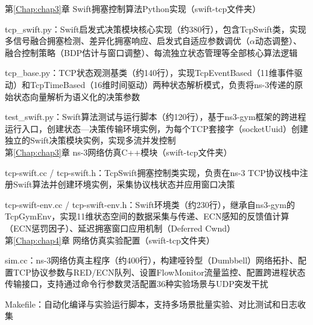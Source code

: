 \begin{ProgramList}

第\ref{Chap:chap3}章 Swift拥塞控制算法Python实现（swift-tcp文件夹）

tcp\_swift.py：Swift启发式决策模块核心实现（约380行），包含TcpSwift类，实现多信号融合拥塞检测、差异化拥塞响应、启发式自适应参数调优（$\alpha$动态调整）、融合控制策略（BDP估计与窗口调整）、每流独立状态管理等全部核心算法逻辑

tcp\_base.py：TCP状态观测基类（约140行），实现TcpEventBased（11维事件驱动）和TcpTimeBased（16维时间驱动）两种状态解析模式，负责将ns-3传递的原始状态向量解析为语义化的决策参数

test\_swift.py：Swift算法测试与运行脚本（约120行），基于ns3-gym框架的跨进程运行入口，创建状态—决策传输环境实例，为每个TCP套接字（socketUuid）创建独立的Swift决策模块实例，实现多流并发控制
\\

第\ref{Chap:chap3}章 ns-3网络仿真C++模块（swift-tcp文件夹）

tcp-swift.cc / tcp-swift.h：TcpSwift拥塞控制类实现，负责在ns-3 TCP协议栈中注册Swift算法并创建环境实例，采集协议栈状态并应用窗口决策

tcp-swift-env.cc / tcp-swift-env.h：Swift环境类（约230行），继承自ns3-gym的TcpGymEnv，实现11维状态空间的数据采集与传递、ECN感知的反馈值计算（ECN惩罚因子）、延迟拥塞窗口应用机制（Deferred Cwnd）
\\

第\ref{Chap:chap4}章 网络仿真实验配置（swift-tcp文件夹）

sim.cc：ns-3网络仿真主程序（约400行），构建哑铃型（Dumbbell）网络拓扑、配置TCP协议参数与RED/ECN队列、设置FlowMonitor流量监控、配置跨进程状态传输接口，支持通过命令行参数灵活配置36种实验场景与UDP突发干扰

Makefile：自动化编译与实验运行脚本，支持多场景批量实验、对比测试和日志收集

\end{ProgramList}

